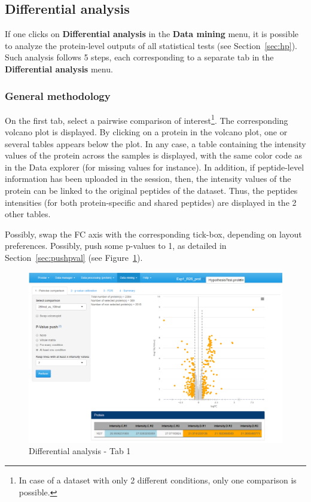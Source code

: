 \documentclass[12pt]{article}
\begin{document}
\subsection{Differential analysis}\label{diffana}

If one clicks on \textbf{Differential analysis} in the \textbf{Data mining} menu, it is possible to analyze the protein-level outputs of all statistical tests (see Section~\ref{sec:hp}).
Such analysis follows 5 steps, each corresponding to a separate tab in the \textbf{Differential analysis} menu.

\subsubsection{General methodology}
  
On the first tab, select a pairwise comparison of interest\footnote{In case of a dataset with only 2 different conditions, only one comparison is possible.}. The corresponding volcano plot is displayed. By clicking on a protein in the volcano plot, one or several tables appears below the plot. In any case, a table containing the  intensity values of the protein across the samples is displayed, with the same color code as in the Data explorer (for missing values for instance). In addition, if peptide-level information has been uploaded in the  session, then, the intensity values of the protein can be linked to the original peptides of the dataset. Thus, the peptides intensities (for both protein-specific and shared peptides) are displayed in the 2 other tables.

Possibly, swap the FC axis with the corresponding tick-box, depending on layout preferences. Possibly, push some p-values to 1, as detailed in Section~\ref{sec:pushpval} (see Figure~\ref{fig:pushpval}). 
\begin {figure}
\includegraphics[width=\textwidth]{images/pushpval.png}
\caption{Differential analysis - Tab 1}\label{fig:pushpval}
\end {figure}
\end{document}
